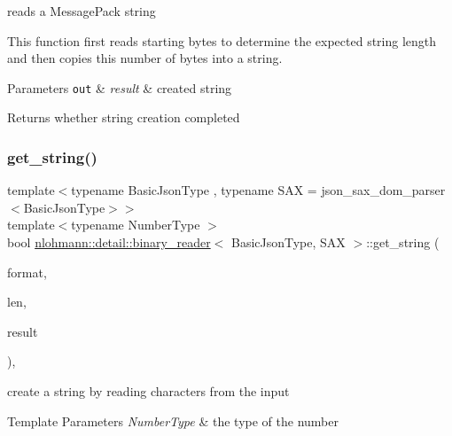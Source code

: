 reads a Message\+Pack string 

This function first reads starting bytes to determine the expected string length and then copies this number of bytes into a string.


\begin{DoxyParams}[1]{Parameters}
\mbox{\tt out}  & {\em result} & created string\\
\hline
\end{DoxyParams}
\begin{DoxyReturn}{Returns}
whether string creation completed 
\end{DoxyReturn}
\mbox{\label{classnlohmann_1_1detail_1_1binary__reader_a1f4b5da029a561c8711426b0a7316ec6}} 
\subsubsection{\texorpdfstring{get\+\_\+string()}{get\_string()}}
{\footnotesize\ttfamily template$<$typename Basic\+Json\+Type , typename S\+AX  = json\+\_\+sax\+\_\+dom\+\_\+parser$<$\+Basic\+Json\+Type$>$$>$ \\
template$<$typename Number\+Type $>$ \\
bool \mbox{\hyperlink{classnlohmann_1_1detail_1_1binary__reader}{nlohmann\+::detail\+::binary\+\_\+reader}}$<$ Basic\+Json\+Type, S\+AX $>$\+::get\+\_\+string (\begin{DoxyParamCaption}\item[{const \mbox{\hyperlink{namespacenlohmann_1_1detail_aa554fc6a11519e4f347deb25a9f0db40}{input\+\_\+format\+\_\+t}}}]{format,  }\item[{const Number\+Type}]{len,  }\item[{string\+\_\+t \&}]{result }\end{DoxyParamCaption})\hspace{0.3cm}{\ttfamily [inline]}, {\ttfamily [private]}}



create a string by reading characters from the input 


\begin{DoxyTemplParams}{Template Parameters}
{\em Number\+Type} & the type of the number \\
\hline
\end{DoxyTemplParams}

